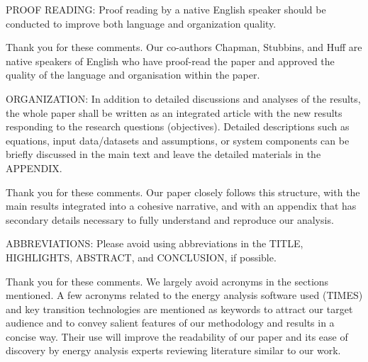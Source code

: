 \documentclass[answers,11pt]{exam}
\begin{document}
\begin{questions}
\begin{solution}
        \end{solution}


     \question  PROOF READING: Proof reading by a native English speaker should be conducted to improve both language and organization quality.
        
        \begin{solution}
                Thank you for these comments. Our co-authors Chapman, Stubbins, and Huff are native speakers of English who have proof-read the paper and approved the quality of the language and organisation within the paper.
                
        \end{solution}

    
 \question ORGANIZATION: In addition to detailed discussions and analyses of the results, the whole paper shall be written as an integrated article with the new results responding to the research questions (objectives). Detailed descriptions such as equations, input data/datasets and assumptions, or system components can be briefly discussed in the main text and leave the detailed materials in the APPENDIX. 
        
        \begin{solution}
                Thank you for these comments. Our paper closely follows this structure, with the main results integrated into a cohesive narrative, and with an appendix that has secondary details necessary to fully understand and reproduce our analysis.
                
        \end{solution}

   
\question  
ABBREVIATIONS: Please avoid using abbreviations in the TITLE, HIGHLIGHTS, ABSTRACT, and CONCLUSION, if possible.
        
        \begin{solution}
                Thank you for these comments. We largely avoid acronyms in the sections mentioned. A few acronyms related to the energy analysis software used (TIMES) and key transition technologies are mentioned as keywords to attract our target audience and to convey salient features of our methodology and results in a concise way. Their use will improve the readability of our paper and its ease of discovery by energy analysis experts reviewing literature similar to our work.
                

\end{solution}
\end{questions}
\end{document}
